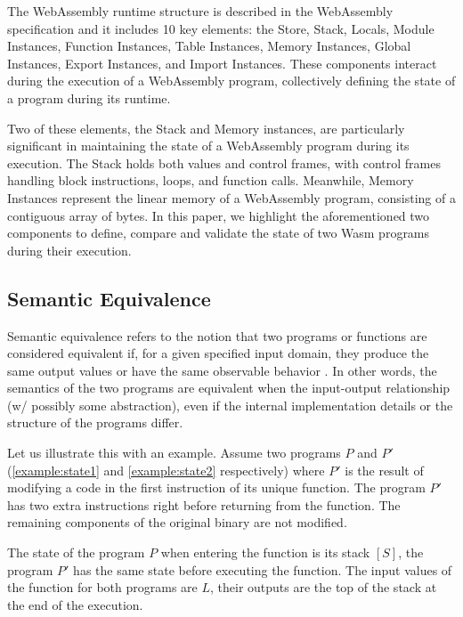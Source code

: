 \documentclass[sigplan,screen]{acmart}
\newcommand*\badge[1]{ \colorbox{red}{\color{white}#1}}
\newcommand{\todo}[1]{%
\refstepcounter{todo}
\noindent\textbf{\badge{TODO}} {\color{red}#1}
\addcontentsline{td}{todo}
{\color{red}\thesection.\thetodo\xspace #1}}
\begin{document}

The WebAssembly runtime structure is described in the WebAssembly specification and it includes 10 key elements: the Store, Stack, Locals, Module Instances, Function Instances, Table Instances, Memory Instances, Global Instances, Export Instances, and Import Instances. These components interact during the execution of a WebAssembly program, collectively defining the state of a program during its runtime.

Two of these elements, the Stack and Memory instances, are particularly significant in maintaining the state of a WebAssembly program during its execution. The Stack holds both values and control frames, with control frames handling block instructions, loops, and function calls. Meanwhile, Memory Instances represent the linear memory of a WebAssembly program, consisting of a contiguous array of bytes.
In this paper, we highlight the aforementioned two components to define, compare and validate the state of two Wasm programs during their execution. 

\subsection{Semantic Equivalence}

Semantic equivalence refers to the notion that two programs or functions are considered equivalent if, for a given specified input domain, they produce the same output values or have the same observable behavior \cite{Semantic equivalence}. 
In other words, the semantics of the two programs are equivalent when the input-output relationship (w/ possibly some abstraction), even if the internal implementation details or the structure of the programs differ.


Let us illustrate this with an example.
Assume two programs $P$ and $P'$ (\autoref{example:state1} and \autoref{example:state2} respectively) where $P'$ is the result of modifying a code in the first instruction of its unique function.
The program $P'$ has two extra instructions right before returning from the function.
The remaining components of the original binary are not modified.




The state of the program $P$ when entering the function is its stack $[S]$, 
the program $P'$ has the same state before executing the function.
The input values of the function for both programs are $L$, their outputs are the top of the stack at the end of the execution.
\end{document}

